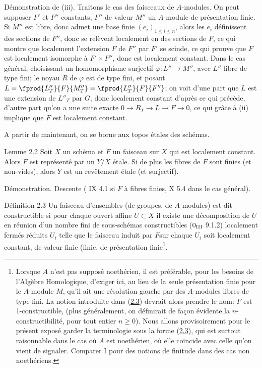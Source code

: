 \documentclass[10pt]{../fichiers-configuration-latex/smfart}
\begin{document}
Démonstration de (iii). Traitons le cas des faisceaux de
$A$-modules. On peut supposer $F'$ et $F''$ constants, $F''$ de valeur
$M''$ un $A$-module de présentation finie. Si $M''$ est libre, donc
admet une base finie $(e_i)_{1\leq i\leq n}$, alors les $e_i$
définissent des sections de $F''$, donc se relèvent localement en des
sections de $F$, ce qui montre que localement l'extension $F$ de $F''$
par $F'$ se scinde, ce qui prouve que $F$ est localement isomorphe à
$F'\times F''$, donc est localement constant. Dans le cas général,
choisissant un homomorphisme surjectif $\varphi:L''\rightarrow M''$,
avec $L''$ libre de type fini; le noyau $R$ de $\varphi$ est de type
fini, et posant $L=\fprod{L''_T}{F}{M''_T}=\fprod{L''_T}{F}{F''}$; on
voit d'une part que $L$ est une extension de $L''_T$ par $G$, donc
localement constant d'après ce qui précède, d'autre part qu'on a une
suite exacte $0\rightarrow R_T\rightarrow L\rightarrow F\rightarrow
0$, ce qui grâce à (ii) implique que $F$ est localement constant.

A partir de maintenant, on se borne aux topos étales des schémas.

\begin{enonce*}{Lemme 2.2}
Soit $X$ un schéma et $F$ un faisceau sur $X$ qui est localement
constant. Alors $F$ est représenté par un $Y/X$ étale. Si de plus les
fibres de $F$ sont finies (\resp et non-vides), alors $Y$ est un
revêtement étale (\resp et surjectif).
\end{enonce*}

Démonstration. Descente ( IX 4.1 si $F$ à fibres finies,  X
5.4 dans le cas général).

\begin{enonce*}{Définition 2.3}
Un faisceau d'ensembles (\resp de groupes, \resp de $A$-modules) est
dit constructible si pour chaque ouvert affine $U\subset X$ il existe
une décomposition de $U$ en réunion d'un nombre fini de sous-schémas
constructibles {\rm (\EGA $0_{{\rm III}}$ 9.1.2)} localement fermés
réduits $U_i$ telle que le faisceau induit par $F$\pageoriginale sur
chaque $U_i$ soit localement constant, de valeur finie (\resp finie,
\resp de présentation finie\footnote[1]{Lorsque $A$ n'est pas
  supposé noethérien, il est préférable, pour les besoins de l'Algèbre
Homologique, d'exiger ici, au lieu de la seule présentation finie pour
le $A$-module $M$, qu'il ait une résolution gauche par des $A$-modules
libres de type fini. La notion introduite dans (\hyperref[IX.def2.3]{2.3}) devrait alors
prendre le nom: $F$ est 1-constructible, (plus généralement, on
définirait de façon évidente la $n$-constructibilité, pour tout
entier $n\geq 0$). Nous allons provisoirement pour le présent exposé
garder la terminologie sous la forme (\hyperref[IX.def2.3]{2.3}), qui est surtout
raisonnable dans le cas où $A$ est noethérien, où elle coïncide avec
celle qu'on vient de signaler. Comparer  I pour des notions de
finitude dans des cas non noethériens.}.
\end{enonce*}
\end{document}
